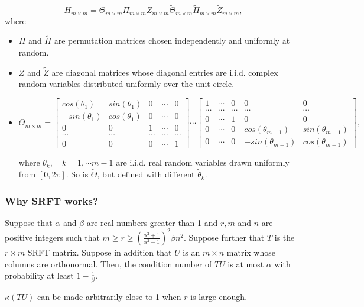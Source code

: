 $$
H_{m \times m} =\Theta_{m \times m} \Pi_{m \times m} Z_{m \times m} \tilde{\Theta}_{m \times m}\tilde{\Pi}_{m \times m} \tilde{Z}_{m \times m},
$$
where


\begin{itemize}
	\item $\Pi$ and $\tilde{\Pi}$ are permutation matrices chosen independently and uniformly at random. \\
	\item $Z$ and $\tilde{Z}$ are diagonal matrices whose diagonal entries are i.i.d. complex random variables distributed uniformly over the unit circle. \\
	\item
	$\Theta_{m \times m} = \begin{bmatrix} cos(\theta_1)& sin(\theta_1) & 0& \cdots &0\\
	- sin(\theta_1)  & cos(\theta_1) & 0 & \cdots & 0 \\
	0 & 0 & 1 & \cdots & 0 \\
	\cdots & \cdots & \cdots & \cdots & \cdots  \\
	0 & 0 &0 & \cdots & 1
	\end{bmatrix}
	\cdots
	\begin{bmatrix} 1& \cdots & 0& 0  &0\\
	\cdots  & \cdots  & \cdots & \cdots & \cdots \\
	0 & \cdots & 1 & 0 & 0 \\
	0 & \cdots & 0 & cos(\theta_{m-1})& sin(\theta_{m-1}) \\
	0 & \cdots &0 &  -sin(\theta_{m-1}) & cos(\theta_{m-1})
	\end{bmatrix} ,$
	
	
	where $\theta_k, \quad k =1 ,\cdots m-1$ are i.i.d. real random variables drawn uniformly from $[0,2\pi]$.
	So is $\tilde{\Theta}$, but defined with different $\tilde{\theta}_k$.
	
\end{itemize}


\subsubsection{Why SRFT works?}
\begin{corollary}
	Suppose that $\alpha$ and $\beta$ are real numbers greater than 1 and $r,m$ and $n$ are positive integers such that $m \geq r \geq (\frac{\alpha^2 +1}{\alpha^2-1})^2 \beta n^2. $ Suppose further that $T$ is the $r \times m$ SRFT matrix. Suppose in addition that $U$ is an $m \times n$ matrix whose columns are orthonormal.
	Then, the condition number of $TU$ is at most $\alpha$ with probability at least $1 - \frac{1}{\beta}. $
\end{corollary}
$\kappa(TU)$ can be made arbitrarily close to 1 when $r$ is large enough.

